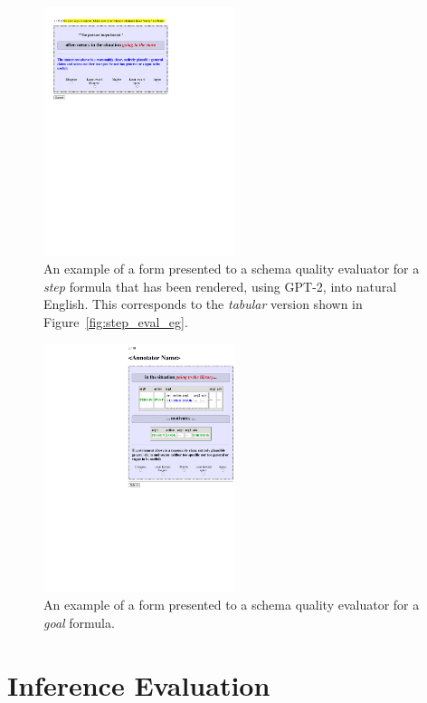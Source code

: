 \begin{figure}
    \centering
    \includegraphics[width=0.5\textwidth]{CH5_eval/gpteval}
    \caption{An example of a form presented to a schema quality evaluator for a \textit{step} formula that has been rendered, using GPT-2, into natural English. This corresponds to the \textit{tabular} version shown in Figure~\ref{fig:step_eval_eg}.}
    \label{fig:gpt_step_eval_eg}
\end{figure}

\begin{figure}
    \centering
    \includegraphics[width=0.5\textwidth]{CH4_learning/evaleg4.pdf}
    \caption{An example of a form presented to a schema quality evaluator for a \textit{goal} formula.}
    \label{fig:goal_eval_eg}
\end{figure}

\section{Inference Evaluation}
\label{sec:inf_eval}

